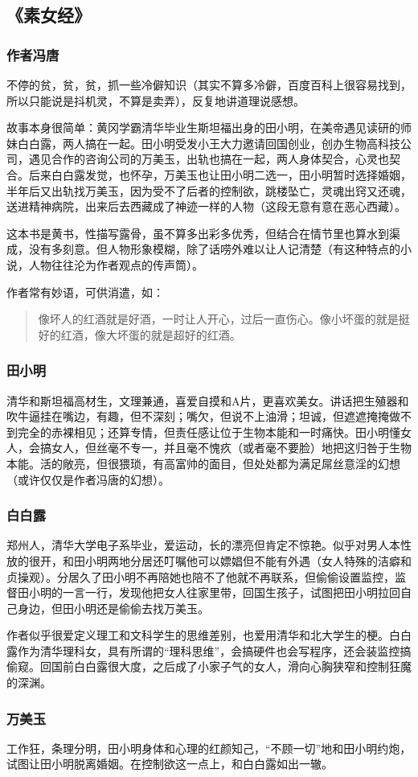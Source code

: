 \subsection{《素女经》}
\subsubsection{作者冯唐}

不停的贫，贫，贫，抓一些冷僻知识（其实不算多冷僻，百度百科上很容易找到，所以只能说是抖机灵，不算是卖弄），反复地讲道理说感想。

故事本身很简单：黄冈学霸清华毕业生斯坦福出身的田小明，在美帝遇见读研的师妹白白露，两人搞在一起。田小明受发小王大力邀请回国创业，创办生物高科技公司，遇见合作的咨询公司的万美玉，出轨也搞在一起，两人身体契合，心灵也契合。后来白白露发觉，也怀孕，万美玉也让田小明二选一，田小明暂时选择婚姻，半年后又出轨找万美玉，因为受不了后者的控制欲，跳楼坠亡，灵魂出窍又还魂，送进精神病院，出来后去西藏成了神迹一样的人物（这段无意有意在恶心西藏）。

这本书是黄书，性描写露骨，虽不算多出彩多优秀，但结合在情节里也算水到渠成，没有多刻意。但人物形象模糊，除了话唠外难以让人记清楚（有这种特点的小说，人物往往沦为作者观点的传声筒）。

作者常有妙语，可供消遣，如：
\begin{quotation}
像坏人的红酒就是好酒，一时让人开心，过后一直伤心。像小坏蛋的就是挺好的红酒，像大坏蛋的就是超好的红酒。
\end{quotation}

\subsubsection{田小明}
清华和斯坦福高材生，文理兼通，喜爱自摸和A片，更喜欢美女。讲话把生殖器和吹牛逼挂在嘴边，有趣，但不深刻；嘴欠，但说不上油滑；坦诚，但遮遮掩掩做不到完全的赤裸相见；还算专情，但责任感让位于生物本能和一时痛快。田小明懂女人，会搞女人，但丝毫不专一，并且毫不愧疚（或者毫不要脸）地把这归咎于生物本能。活的敞亮，但很猥琐，有高富帅的面目，但处处都为满足屌丝意淫的幻想（或许仅仅是作者冯唐的幻想）。

\subsubsection{白白露}
郑州人，清华大学电子系毕业，爱运动，长的漂亮但肯定不惊艳。似乎对男人本性放的很开，和田小明两地分居还叮嘱他可以嫖娼但不能有外遇（女人特殊的洁癖和贞操观）。分居久了田小明不再陪她也陪不了他就不再联系，但偷偷设置监控，监督田小明的一言一行，发现他把女人往家里带，回国生孩子，试图把田小明拉回自己身边，但田小明还是偷偷去找万美玉。

作者似乎很爱定义理工和文科学生的思维差别，也爱用清华和北大学生的梗。白白露作为清华理科女，具有所谓的“理科思维”，会搞硬件也会写程序，还会装监控搞偷窥。回国前白白露很大度，之后成了小家子气的女人，滑向心胸狭窄和控制狂魔的深渊。

\subsubsection{万美玉}
工作狂，条理分明，田小明身体和心理的红颜知己，“不顾一切”地和田小明约炮，试图让田小明脱离婚姻。在控制欲这一点上，和白白露如出一辙。